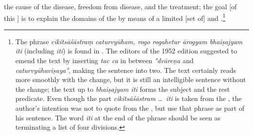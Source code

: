 the cause of the disease, freedom from disease, and the treatment; the goal [of this \sastra] is to explain the domains of the  by means of a limited [set of]  and .\footnote{The phrase \emph{cikitsāśāstraṃ caturvyūham, rogo rogahetur ārogyam bhaiṣajyam iti}  (including \emph{iti}) is found in .  The editors of the 1952 edition suggested to emend the text by inserting \emph{tac ca} in between \emph{°dvāreṇa} and \emph{caturvyūhaviṣaya°}, making the sentence into two.  The text certainly reads more smoothly with the change, but it is still an intelligible sentence without the change; the text up to \emph{bhaiṣajyam iti} forms the subject and the rest predicate.  Even though the part \emph{cikitsāśāstram \ldots\ iti} is taken from the \bhasya, the author's intention was not to quote from the \bhasya, but use that phrase as part of his sentence.  The word \emph{iti} at the end of the phrase should be seen as terminating a list of four divisions.

}
